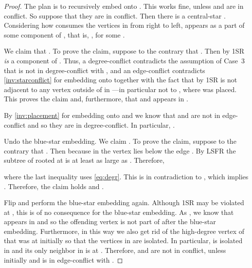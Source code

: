 \documentclass[11pt,a4paper,colorlinks=true,urlcolor=blue,citecolor=red]{article}
\theoremstyle{plain}
\begin{document}
\begin{proof}
  The plan is to recursively embed  onto . This works fine,
  unless  and  are in conflict. So suppose that they are in
  conflict. Then there is a central-star
  . Considering how  consumes the
  vertices in  from right to left,  appears as a part of some
  component of , that is, , for some .

  We claim that . To prove the claim, suppose to the
  contrary that . Then by 1SR  \emph{is} a
  component of . Thus, a degree-conflict contradicts the assumption
  of Case~3 that  is not in degree-conflict with , and
  an edge-conflict contradicts \ref{inv:starconflict} for embedding 
  onto  together with the fact that by 1SR  is not adjacent to
  any vertex outside of  in ---in particular not to , where 
  was placed. This proves the claim and, furthermore, that
   and  appears in .

  By \ref{inv:placement} for embedding  onto  and
   we know that  and  are not in
  edge-conflict and so they are in degree-conflict.  In particular,
  .

  Undo the blue-star embedding. We claim . To prove the claim, suppose to the contrary that
  . Then  because in  the
  vertex  lies below the edge . By LSFR the subtree
  of  rooted at  is at least as large as . Therefore,
  
where the last inequality uses \eqref{eq:degr}. This is in
  contradiction to , which implies
  . Therefore, the claim holds and
  .

  Flip  and perform the blue-star embedding again. Although
  1SR may be violated at , this is of no consequence for the
  blue-star embedding. As , we know that
   appears in  and so the offending vertex is not part of
   after the blue-star embedding. Furthermore, in this way we
  also get rid of the high-degree vertex of  that was at 
  initially so that the vertices in  are isolated.
  In particular,  is isolated in  and its only neighbor in
   is at . Therefore,  and  are not in
  conflict, unless  initially and  is in
  edge-conflict with .


\end{proof}
\end{document}

